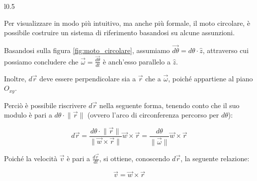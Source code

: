 \documentclass[oneside]{book}
\newcommand{\norm}[1]{\lVert \vec{#1} \rVert}
\begin{document}
\begin{wrapfigure}[12]{l}{0.5\textwidth}

    \caption{Il moto circolare nel piano $O_{xy}$} \label{fig:moto_circolare}
\end{wrapfigure}

Per visualizzare in modo più intuitivo, ma anche più formale, il
moto circolare, è possibile costruire un sistema di riferimento
basandosi su alcune assunzioni.

Basandosi sulla figura \ref{fig:moto_circolare}, assumiamo
$\vec{d\theta} = d\theta \cdot \hat{z}$, attraverso cui
possiamo concludere che $\vec{\omega}=\frac{\vec{d\theta}}{dt}$ è anch'esso
parallelo a $\hat{z}$.

Inoltre, $d\vec{r}$ deve essere perpendicolare sia a $\vec{r}$ che
a $\vec{\omega}$, poiché appartiene al piano $O_{xy}$.

Perciò è possibile riscrivere $d\vec{r}$ nella seguente forma, tenendo
conto che il suo modulo è pari a $d\theta \cdot \norm{r}$ (ovvero
l'arco di circonferenza percorso per $d\theta$):

\begin{equation*}
    d\vec{r}=\frac{d\theta \cdot \norm{r}}{\lVert \vec{w} \times
    \vec{r} \rVert} \vec{w} \times \vec{r} =
    \frac{d\theta}{\norm{\omega}} \vec{w} \times \vec{r}
\end{equation*}

Poiché la velocità $\vec{v}$ è pari a $\frac{d\vec{r}}{dt}$, si ottiene,
conoscendo $d\vec{r}$, la seguente relazione:

\begin{equation}
    \vec{v}=\vec{w}\times\vec{r}
\end{equation}
\end{document}
